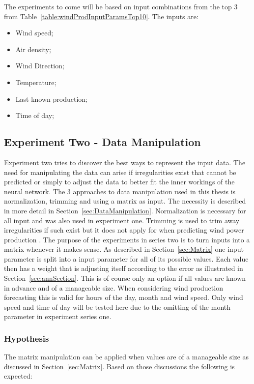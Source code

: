 The experiments to come will be based on input combinations from the top 3 from Table~\ref{table:windProdInputParamsTop10}. The inputs are:
\begin{itemize}
\item Wind speed;
\item Air density;
\item Wind Direction;
\item Temperature;
\item Last known production;
\item Time of day;
\end{itemize}


\subsection{Experiment Two - Data Manipulation}
Experiment two tries to discover the best ways to represent the input data. The need for manipulating the data can arise if irregularities exist that cannot be predicted or simply to adjust the data to better fit the inner workings of the neural network. The 3 approaches to data manipulation used in this thesis is normalization, trimming and using a matrix as input. The necessity is described in more detail in Section~\ref{sec:DataManipulation}. Normalization is necessary for all input and was also used in experiment one. Trimming is used to trim away irregularities if such exist but it does not apply for when predicting wind power production . The purpose of the experiments in series two is to turn inputs into a matrix whenever it makes sense. As described in Section~\ref{sec:Matrix} one input parameter is split into a input parameter for all of its possible values. Each value then has a weight that is adjusting itself according to the error as illustrated in Section~\ref{sec:annSection}. This is of course only an option if all values are known in advance and of a manageable size. When considering wind production forecasting this is valid for hours of the day, month and wind speed. Only wind speed and time of day will be tested here due to the omitting of the month parameter in experiment series one.

\subsubsection{Hypothesis} 
The matrix manipulation can be applied when values are of a manageable size as discussed in Section~\ref{sec:Matrix}. Based on those discussions the following is expected: 

